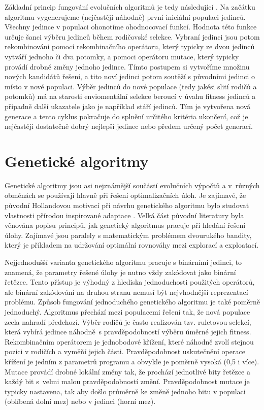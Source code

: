 \documentclass[12pt,fleqn,a4paper,proc]{article}
\begin{document}
Základní princip fungování evolučních algoritmů je tedy následující \cite{eiben}. Na začátku algoritmu vygenerujeme (nejčastěji náhodně) první iniciální populaci jedinců. Všechny jedince v populaci ohonotíme ohodnocovací funkcí. Hodnota této funkce určuje šanci výběru jedinců během rodičovské selekce. Vybraní jedinci jsou potom rekombinováni pomocí rekombinačního operátoru, který typicky ze dvou jedinců vytváří jednoho či dva potomky, a pomoci operátoru mutace, který typicky provádí drobné změny jednoho jedince. Tímto postupem si vytvoříme množinu nových kandidátů řešení, a tito noví jedinci potom soutěží s původními jedinci o místo v nové populaci. Výběr jedinců do nové populace (tedy jakési slití rodičů a potomků) má na starosti enviomentální selekce beroucí v úvahu fitness jedinců a připadně další ukazatele jako je například stáří jedinců. Tím je vytvořena nová generace a tento cyklus pokračuje do splnění určitého kritéria ukončení, což je nejčastěji dostatečně dobrý nejlepší jedinec nebo předem určený počet generací.



\section{Genetické algoritmy}

Genetické algoritmy jsou asi nejznámější součástí evolučních výpočtů a v~různých obměnách se používají hlavně při řešení optimalizačních úloh. Je zajímavé, že původní Hollandovou motivací při návrhu genetického algoritmu bylo studovat vlastnosti přírodou inspirované adaptace \cite{holland}. Velká část původní literatury byla věnována popisu principů, jak genetický algoritmus pracuje při hledání řešení úlohy. Zajímavé jsou paralely s matematickým problémem dvourukého bandity, který je příkladem na udržování optimální rovnováhy mezi explorací a exploatací. 

Nejjednodušší varianta genetického algoritmu pracuje s binárními jedinci, to znamená, že parametry řešené úlohy je nutno vždy zakódovat jako binární řetězce. Tento přístup je výhodný z hlediska jednoduchosti použitých operátorů, ale binární zakódování na druhou stranu nemusí být nejvhodnější reprezentací problému. Způsob fungování jednoduchého genetického algoritmu je také poměrně jednoduchý. Algoritmus přechází mezi populacemi řešení tak, že nová populace zcela nahradí předchozí. Výběr rodičů je často realizován tzv. ruletovou selekcí, která vybírá jedince náhodně~s pravděpodobností výběru úměrné jejich fitness. Rekombinačním operátorem je jednobodové křížení, které náhodně zvolí stejnou pozici v rodičích a vyměňí jejich části. Pravděpodobnost uskutečnění operace křížení je jedním z parametrů programu a obvykle je poměrně vysoká (0,5 i více). Mutace provádí drobné lokální změny tak, že prochází jednotlivé bity řetězce a každý bit s~velmi malou pravděpodobností změní. Pravděpodobnost mutace je typicky nastavena, tak aby došlo průměrně ke změně jednoho bitu v populaci (oblíbená dolní mez) nebo v jedinci (horní mez). 
\end{document}
